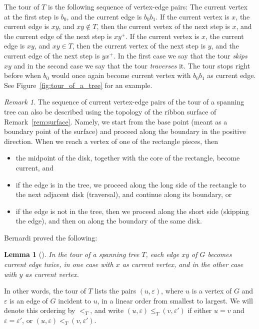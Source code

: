 \documentclass[10pt]{amsart}
\newtheorem{lemma}[theo]{Lemma}
\theoremstyle{definition}\newtheorem{defi}[theo]{Definition}
\theoremstyle{remark}\newtheorem{rema}[theo]{Remark}
\begin{document}
The tour of $T$ is the following sequence of vertex-edge pairs: The current vertex at the first step is $b_0$, and the current edge is $b_0b_1$. If the current vertex is $x$, the current edge is $xy$, and $xy\notin T$, then the current vertex of the next step is $x$, and the current edge of the next step is $xy^+$. If the current vertex is $x$, the current edge is $xy$, and $xy\in T$, then the current vertex of the next step is $y$, and the current edge of the next step is $yx^+$. In the first case we say that the tour \emph{skips} $xy$ and in the second case we say that the tour \emph{traverses} it. The tour stops right before when $b_0$ would once again become current vertex with $b_0b_1$ as current edge. See Figure~\ref{fig:tour_of_a_tree} for an example.

\begin{rema}
	\label{rem:topological_interpretation_of_tour_of_a_tree}
	The sequence of current vertex-edge pairs of the tour of a spanning tree can also be described using the topology of the ribbon surface of Remark~\ref{rem:surface}. Namely, we start from the base point (meant as a boundary point of the surface) and proceed along the boundary in the positive direction. When we reach a vertex of one of the rectangle pieces, then
	\begin{itemize}
		\item the midpoint of the disk, together with the core of the rectangle, become current, and
		\item if the edge is in the tree, we proceed along the long side of the rectangle to the next adjacent disk (traversal), and continue along its boundary, or
		\item if the edge is not in the tree, then we proceed along the short side (skipping the edge), and then on along the boundary of the same disk. 
	\end{itemize}
\end{rema}

Bernardi proved the following:

\begin{lemma}[{\cite[Lemma~5]{Bernardi_first}}]
\label{l:T-tour_cyclic_perm}
In the tour of a spanning tree $T$, each edge $xy$ of $G$ becomes current edge twice, in one case with $x$ as current vertex, and in the other case with $y$ as current vertex.
\end{lemma}
 
In other words, the tour of $T$ lists the pairs $(u,\varepsilon)$, where $u$ is a vertex of $G$ and $\varepsilon$ is an edge of $G$ incident to $u$, in a linear order from smallest to largest. We will denote this ordering by $<_T$, and write $(u,\varepsilon)\leq_T (v,\varepsilon')$ if either $u=v$ and $\varepsilon=\varepsilon'$, or $(u,\varepsilon)<_T (v,\varepsilon')$.
\end{document}
